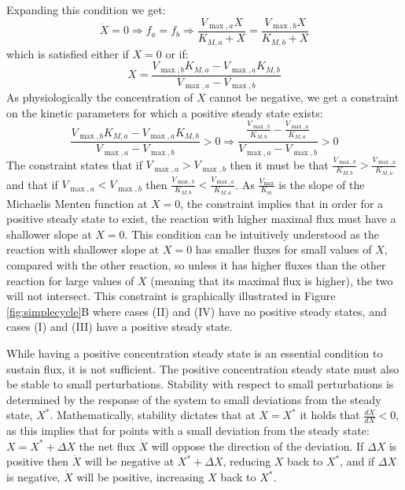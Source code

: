 \documentclass[a4page,notitlepage]{article}
\begin{document}
    Expanding this condition we get:
    \begin{equation*}
      \dot X = 0 \Rightarrow f_a = f_b \Rightarrow \frac{V_{\max,a}X}{K_{M,a}+X}=\frac{V_{\max,b}X}{K_{M,b}+X}
    \end{equation*}
    which is satisfied either if $X=0$ or if:
    \begin{equation}
      \label{eq:xstst}
      X=\frac{V_{\max,b}K_{M,a}-V_{\max,a}K_{M,b}}{V_{\max,a}-V_{\max,b}}
    \end{equation}
    As physiologically the concentration of $X$ cannot be negative, we get a constraint on the kinetic parameters for which a positive steady state exists:
    \begin{equation*}
      \frac{V_{\max,b}K_{M,a}-V_{\max,a}K_{M,b}}{V_{\max,a}-V_{\max,b}}>0 \Rightarrow \frac{\frac{V_{\max,b}}{K_{M,b}}-\frac{V_{\max,a}}{K_{M,a}}}{V_{\max,a}-V_{\max,b}}>0
    \end{equation*}
    The constraint states that if $V_{\max,a}>V_{\max,b}$ then it must be that $\frac{V_{\max,b}}{K_{M,b}}>\frac{V_{\max,a}}{K_{M,a}}$ and that if $V_{\max,a}<V_{\max,b}$ then $\frac{V_{\max,b}}{K_{M,b}}<\frac{V_{\max,a}}{K_{M,a}}$.
    As $\frac{V_{\max}}{K_m}$ is the slope of the Michaelis Menten function at $X=0$, the constraint implies that in order for a positive steady state to exist, the reaction with higher maximal flux must have a shallower slope at $X=0$.
    This condition can be intuitively understood as the reaction with shallower slope at $X=0$ has smaller fluxes for small values of $X$, compared with the other reaction, so unless it has higher fluxes than the other reaction for large values of $X$ (meaning that its maximal flux is higher), the two will not intersect.
    This constraint is graphically illustrated in Figure \ref{fig:simplecycle}B where cases (II) and (IV) have no positive steady states, and cases (I) and (III) have a positive steady state.

    While having a positive concentration steady state is an essential condition to sustain flux, it is not sufficient.
    The positive concentration steady state must also be stable to small perturbations.
    Stability with respect to small perturbations is determined by the response of the system to small deviations from the steady state, $X^*$.
    Mathematically, stability dictates that at $X=X^*$ it holds that $\frac{d\dot X}{dX} <0$, as this  implies that for points with a small deviation from the steady state: $X = X^*+\Delta X$ the net flux $\dot X$ will oppose the direction of the deviation.
    If $\Delta X$ is positive then $\dot X$ will be negative at $X^*+\Delta X$, reducing $X$ back to $X^*$, and if $\Delta X$ is negative, $\dot X$ will be positive, increasing $X$ back to $X^*$.
\end{document}
